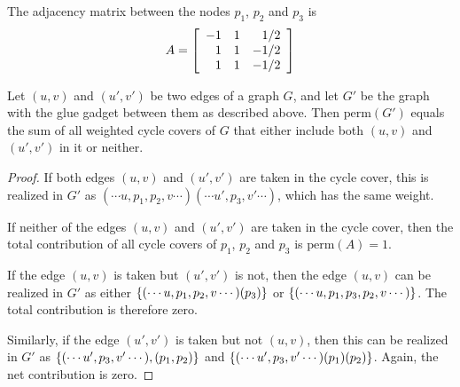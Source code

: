 \begin{center}
\end{center}
The adjacency matrix between the nodes $p_1$, $p_2$ and $p_3$ is 
\[
A = \left[\begin{array}{rrr}
-1 & 1 & 1/2\\
1 & 1 & -1/2\\
1 & 1 & -1/2
\end{array}\right]
\]

\noindent
\begin{claim}
Let $(u,v)$ and $(u',v')$ be two edges of a graph $G$, and let $G'$ be the graph with the glue gadget between them as described above. Then $\mathrm{perm}(G')$ equals the sum of all weighted cycle covers of $G$ that either include both $(u,v)$ and $(u',v')$ in it or neither. 
\end{claim}
\begin{proof}
If both edges $(u,v)$ and $(u',v')$ are taken in the cycle cover, this is realized in $G'$ as ${(\cdots u,p_1, p_2, v \cdots) (\cdots u', p_3, v' \cdots)}$, which has the same weight.  

If neither of the edges $(u,v)$ and $(u',v')$ are taken in the cycle cover, then the total contribution of all cycle covers of $p_1$, $p_2$ and $p_3$ is $\mathrm{perm}(A) = 1$. 

If the edge $(u,v)$ is taken but $(u',v')$ is not, then the edge $(u,v)$ can be realized in $G'$ as either $\left\{(\cdots u,p_1,p_2,v \cdots) (p_3)\right\}$ or $\left\{(\cdots u,p_1,p_3,p_2,v \cdots )\right\}$. The total contribution is therefore zero. 

Similarly, if the edge $(u',v')$ is taken but not $(u,v)$, then this can be realized in $G'$ as $\left\{(\cdots u',p_3,v' \cdots),(p_1,p_2)\right\}$ and $\left\{(\cdots u',p_3, v' \cdots) (p_1) (p_2)\right\}$. Again, the net contribution is zero.  
\end{proof}

